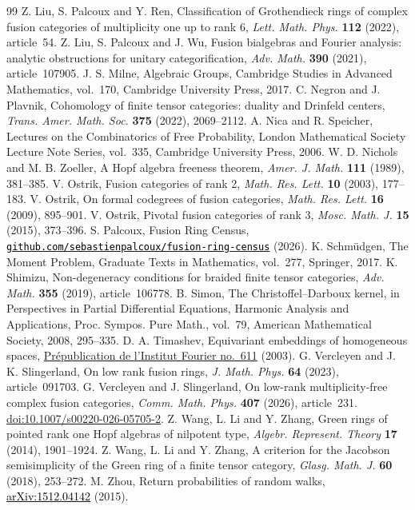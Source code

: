 \documentclass[11pt,reqno]{amsart}
\theoremstyle{definition}
\begin{document}
{\begin{thebibliography}{99}
Z. Liu, S. Palcoux and Y. Ren, Classification of Grothendieck rings of complex fusion categories of multiplicity one up to rank 6, \emph{Lett. Math. Phys.} \textbf{112} (2022), article~54.
 Z. Liu, S. Palcoux and J. Wu, Fusion bialgebras and Fourier analysis: analytic obstructions for unitary categorification, \emph{Adv. Math.} \textbf{390} (2021), article~107905.
 J. S. Milne, Algebraic Groups, Cambridge Studies in Advanced Mathematics, vol.~170, Cambridge University Press, 2017.
 C. Negron and J. Plavnik, Cohomology of finite tensor categories: duality and Drinfeld centers, \emph{Trans. Amer. Math. Soc.} \textbf{375} (2022), 2069--2112.
 A. Nica and R. Speicher, Lectures on the Combinatorics of Free Probability, London Mathematical Society Lecture Note Series, vol.~335, Cambridge University Press, 2006.
 W. D. Nichols and M. B. Zoeller, A Hopf algebra freeness theorem, \emph{Amer. J. Math.} \textbf{111} (1989), 381--385.
 V. Ostrik, Fusion categories of rank 2, \emph{Math. Res. Lett.} \textbf{10} (2003), 177--183.
 V. Ostrik, On formal codegrees of fusion categories, \emph{Math. Res. Lett.} \textbf{16} (2009), 895--901.
 V. Ostrik, Pivotal fusion categories of rank 3, \emph{Mosc. Math. J.} \textbf{15} (2015), 373--396.
 S. Palcoux, Fusion Ring Census,
\href{https://github.com/sebastienpalcoux/fusion-ring-census}{\textcolor{black}{\texttt{github.com/sebastienpalcoux/fusion-ring-census}}} (2026).
 K. Schm\"udgen, The Moment Problem, Graduate Texts in Mathematics, vol.~277, Springer, 2017.
K. Shimizu, Non-degeneracy conditions for braided finite tensor categories,
\emph{Adv. Math.} \textbf{355} (2019), \mbox{article}~106778.
 B. Simon, The Christoffel--Darboux kernel, in Perspectives in Partial Differential Equations, Harmonic Analysis and Applications, Proc. Sympos. Pure Math., vol.~79, American Mathematical Society, 2008, 295--335.
 D. A. Timashev, Equivariant embeddings of homogeneous spaces, \href{https://www-fourier.ujf-grenoble.fr/sites/default/files/REF_611.pdf}{Pr\'epublication de l'Institut Fourier no.~611} (2003).
 G. Vercleyen and J. K. Slingerland, On low rank fusion rings,
\emph{J. Math. Phys.} \textbf{64} (2023), article~091703.
 G. Vercleyen and J. Slingerland, On low-rank multiplicity-free complex fusion categories, \emph{Comm. Math. Phys.} \textbf{407} (2026), article~231. \href{https://doi.org/10.1007/s00220-026-05705-2}{doi:10.1007/s00220-026-05705-2}.
 Z. Wang, L. Li and Y. Zhang, Green rings of pointed rank one Hopf algebras of nilpotent type,
\emph{Algebr. Represent. Theory} \textbf{17} (2014), 1901--1924.
Z. Wang, L. Li and Y. Zhang, A criterion for the Jacobson semisimplicity of the Green ring of a finite tensor category,
\emph{Glasg. Math. J.} \textbf{60} (2018), 253--272.
 M. Zhou, Return probabilities of random walks,
\href{https://arxiv.org/pdf/1512.04142}{\textcolor{black}{\mbox{arXiv:1512.04142}}} (2015).
\end{thebibliography}}
\end{document}
